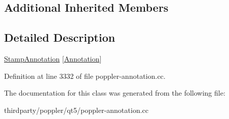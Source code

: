 \subsection*{Additional Inherited Members}


\subsection{Detailed Description}
\hyperlink{class_poppler_1_1_stamp_annotation}{Stamp\+Annotation} \mbox{[}\hyperlink{class_poppler_1_1_annotation}{Annotation}\mbox{]} 

Definition at line 3332 of file poppler-\/annotation.\+cc.



The documentation for this class was generated from the following file\+:\begin{DoxyCompactItemize}
\item 
thirdparty/poppler/qt5/poppler-\/annotation.\+cc\end{DoxyCompactItemize}
